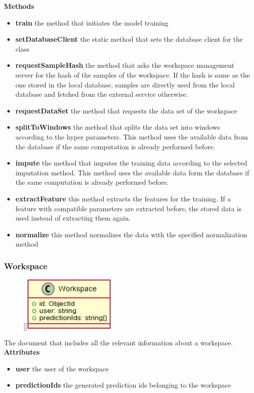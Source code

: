 \textbf{Methods}
\begin{itemize}
    \item \textbf{train} the method that initiates the model training
    \item \textbf{setDatabaseClient} the static method that sets the database client for the class
    \item \textbf{requestSampleHash} the method that asks the workspace management server for the hash of the samples of the workspace. If the hash is same as the one stored in the local database, samples are directly used from the local database and fetched from the external service otherwise.
    \item \textbf{requestDataSet} the method that requests the data set of the workspace
    \item \textbf{splitToWindows} the method that splits the data set into windows according to the hyper parameters. This method uses the available data from the database if the same computation is already performed before.
    \item \textbf{impute} the method that imputes the training data according to the selected imputation method. This method uses the available data form the database if the same computation is already performed before.
    \item \textbf{extractFeature} this method extracts the features for the training. If a feature with compatible parameters are extracted before, the stored data is used instead of extracting them again.
    \item \textbf{normalize} this method normalizes the data with the specified normalization method
\end{itemize}

\subsubsection{Workspace}
\begin{figure}
    \raisebox{0pt}[\dimexpr{}\baselineskip\relax]{\includegraphics[width=4.5cm]{classes/model-management/2.png}}
\end{figure} 
\par
The document that includes all the relevant information about a workspace.
\newline
\newline
\textbf{Attributes}
\begin{itemize}
    \item \textbf{user} the user of the workspace
    \item \textbf{predictionIds} the generated prediction ids belonging to the workspace
\end{itemize}

